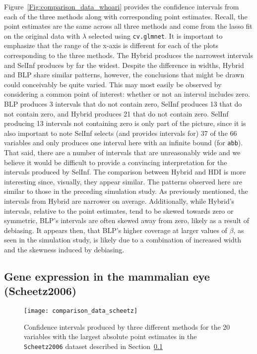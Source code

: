 Figure~\ref{Fig:comparison_data_whoari} provides the confidence intervals from each of the three methods along with corresponding point estimates. Recall, the point estimates are the same across all three methods and come from the lasso fit on the original data with $\lambda$ selected using \texttt{cv.glmnet}. It is important to emphasize that the range of the x-axis is different for each of the plots corresponding to the three methods. The Hybrid produces the narrowest intervals and SelInf produces by far the widest. Despite the difference in widths, Hybrid and BLP share similar patterns, however, the conclusions that might be drawn could conceivably be quite varied. This may most easily be observed by considering a common point of interest: whether or not an interval includes zero. BLP produces 3 intervals that do not contain zero, SelInf produces 13 that do not contain zero, and Hybrid produces 21 that do not contain zero. SelInf producing 13 intervals not containing zero is only part of the picture, since it is also important to note SelInf selects (and provides intervals for) 37 of the 66 variables and only produces one interval here with an infinite bound (for \texttt{abb}). That said, there are a number of intervals that are unreasonably wide and we believe it would be difficult to provide a convincing interpretation for the intervals produced by SelInf. The comparison between Hybrid and HDI is more interesting since, visually, they appear similar. The patterns observed here are similar to those in the preceding simulation study. As previously mentioned, the intervals from Hybrid are narrower on average. Additionally, while Hybrid's intervals, relative to the point estimates, tend to be skewed towards zero or symmetric, BLP's intervals are often skewed away from zero, likely as a result of debiasing. It appears then, that BLP's higher coverage at larger values of $\beta$, as seen in the simulation study, is likely due to a combination of increased width and the skewness induced by debiasing.  

\subsection{Gene expression in the mammalian eye (Scheetz2006)}\label{Sec:Scheetz2006}

\begin{figure}[hbtp]
  \begin{center}
  \texttt{[image: comparison\_data\_scheetz]}
  \caption{\label{Fig:comparison_data_scheetz} Confidence intervals produced by three different methods for the 20 variables with the largest absolute point estimates in the \texttt{Scheetz2006} dataset described in Section~\ref{Sec:Scheetz2006}}
  \end{center}
\end{figure}


